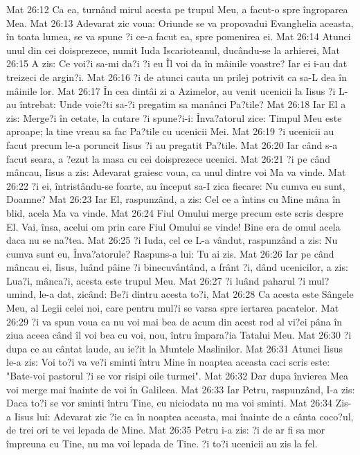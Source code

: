 Mat 26:12  Ca ea, turnând mirul acesta pe trupul Meu, a facut-o spre îngroparea Mea.
Mat 26:13  Adevarat zic voua: Oriunde se va propovadui Evanghelia aceasta, în toata lumea, se va spune ?i ce-a facut ea, spre pomenirea ei.
Mat 26:14  Atunci unul din cei doisprezece, numit Iuda Iscarioteanul, ducându-se la arhierei,
Mat 26:15  A zis: Ce voi?i sa-mi da?i ?i eu Îl voi da în mâinile voastre? Iar ei i-au dat treizeci de argin?i.
Mat 26:16  ?i de atunci cauta un prilej potrivit ca sa-L dea în mâinile lor.
Mat 26:17  În cea dintâi zi a Azimelor, au venit ucenicii la Iisus ?i L-au întrebat: Unde voie?ti sa-?i pregatim sa manânci Pa?tile?
Mat 26:18  Iar El a zis: Merge?i în cetate, la cutare ?i spune?i-i: Înva?atorul zice: Timpul Meu este aproape; la tine vreau sa fac Pa?tile cu ucenicii Mei.
Mat 26:19  ?i ucenicii au facut precum le-a poruncit Iisus ?i au pregatit Pa?tile.
Mat 26:20  Iar când s-a facut seara, a ?ezut la masa cu cei doisprezece ucenici.
Mat 26:21  ?i pe când mâncau, Iisus a zis: Adevarat graiesc voua, ca unul dintre voi Ma va vinde.
Mat 26:22  ?i ei, întristându-se foarte, au început sa-I zica fiecare: Nu cumva eu sunt, Doamne?
Mat 26:23  Iar El, raspunzând, a zis: Cel ce a întins cu Mine mâna în blid, acela Ma va vinde.
Mat 26:24  Fiul Omului merge precum este scris despre El. Vai, însa, acelui om prin care Fiul Omului se vinde! Bine era de omul acela daca nu se na?tea.
Mat 26:25  ?i Iuda, cel ce L-a vândut, raspunzând a zis: Nu cumva sunt eu, Înva?atorule? Raspuns-a lui: Tu ai zis.
Mat 26:26  Iar pe când mâncau ei, Iisus, luând pâine ?i binecuvântând, a frânt ?i, dând ucenicilor, a zis: Lua?i, mânca?i, acesta este trupul Meu.
Mat 26:27  ?i luând paharul ?i mul?umind, le-a dat, zicând: Be?i dintru acesta to?i,
Mat 26:28  Ca acesta este Sângele Meu, al Legii celei noi, care pentru mul?i se varsa spre iertarea pacatelor.
Mat 26:29  ?i va spun voua ca nu voi mai bea de acum din acest rod al vi?ei pâna în ziua aceea când îl voi bea cu voi, nou, întru împara?ia Tatalui Meu.
Mat 26:30  ?i dupa ce au cântat laude, au ie?it la Muntele Maslinilor.
Mat 26:31  Atunci Iisus le-a zis: Voi to?i va ve?i sminti întru Mine în noaptea aceasta caci scris este: "Bate-voi pastorul ?i se vor risipi oile turmei".
Mat 26:32  Dar dupa învierea Mea voi merge mai înainte de voi în Galileea.
Mat 26:33  Iar Petru, raspunzând, I-a zis: Daca to?i se vor sminti întru Tine, eu niciodata nu ma voi sminti.
Mat 26:34  Zis-a Iisus lui: Adevarat zic ?ie ca în noaptea aceasta, mai înainte de a cânta coco?ul, de trei ori te vei lepada de Mine.
Mat 26:35  Petru i-a zis: ?i de ar fi sa mor împreuna cu Tine, nu ma voi lepada de Tine. ?i to?i ucenicii au zis la fel.
